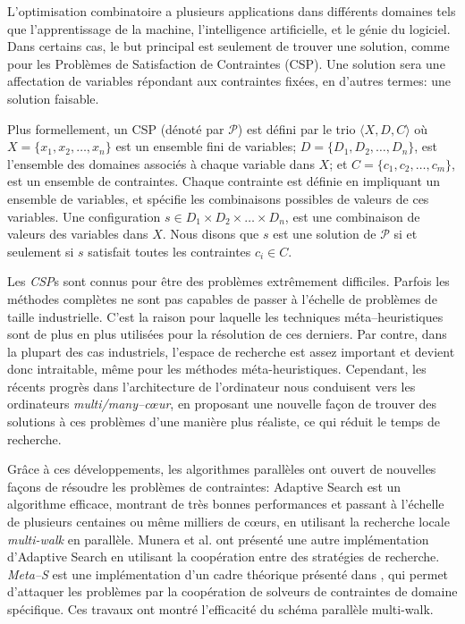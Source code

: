 L'optimisation combinatoire a plusieurs applications dans diff\'erents domaines tels que l'apprentissage de la machine, l'intelligence artificielle, et le g\'enie du logiciel. Dans certains cas, le but principal est seulement de trouver une solution, comme pour les Probl\`emes de Satisfaction de Contraintes (CSP). Une solution sera une affectation de variables r\'epondant aux contraintes fix\'ees, en d'autres termes: une solution faisable.

Plus formellement, un CSP (d\'enot\'e par $\mathcal{P}$) est d\'efini par le trio $\langle X,D,C \rangle$  o\`u $X = \{x_1, x_2,\dots,x_n\}$ est un ensemble fini de variables; $D = \{D_1, D_2,\dots, D_n\}$, est l'ensemble des domaines associ\'es \`a chaque variable dans $X$; et $C = \{c_1, c_2,\dots,c_m\}$, est un ensemble de contraintes. Chaque contrainte est d\'efinie en impliquant un ensemble de variables, et sp\'ecifie les combinaisons possibles de valeurs de ces variables. Une configuration $s\in D_1\times D_2\times\dots\times D_n$, est une combinaison de valeurs des variables dans $X$. Nous disons que $s$ est une solution de $\mathcal{P}$ si et seulement si $s$ satisfait toutes les contraintes $c_i \in C$.

Les {\it CSP}s sont connus pour \^etre des probl\`emes extr\^emement difficiles. Parfois les m\'ethodes compl\`etes ne sont pas capables de passer \`a l'\'echelle de probl\`emes de taille industrielle. C'est la raison  pour laquelle les techniques m\'eta--heuristiques sont de plus en plus utilis\'ees pour la r\'esolution de ces derniers. Par contre, dans la plupart des cas industriels, l'espace de recherche est assez important et devient donc intraitable, m\^eme pour les m\'ethodes m\'eta-heuristiques. Cependant, les r\'ecents progr\`es dans l'architecture de l'ordinateur nous conduisent vers les ordinateurs {\it multi/many--c\oe ur}, en proposant une nouvelle fa\c{c}on de trouver des solutions \`a ces probl\`emes d'une mani\`ere plus r\'ealiste, ce qui r\'eduit le temps de recherche.

Gr\^ace \`a ces d\'eveloppements, les algorithmes parall\`eles ont ouvert de nouvelles fa\c{c}ons de r\'esoudre les probl\`emes de contraintes: Adaptive Search \cite{Diaz} est un algorithme efficace, montrant de tr\`es bonnes performances et passant \`a l'\'echelle de plusieurs centaines ou m\^eme milliers de c\oe urs, en utilisant la recherche locale {\it multi-walk} en parall\`ele. Munera et al. \cite{Munera} ont pr\'esent\'e une autre impl\'ementation d'Adaptive Search en utilisant la coop\'eration entre des strat\'egies de recherche. {\it Meta--S} est une impl\'ementation d'un cadre th\'eorique pr\'esent\'e dans \cite{Frank2003}, qui permet d'attaquer les probl\`emes par la coop\'eration de solveurs de contraintes de domaine sp\'ecifique. 
Ces travaux ont montr\'e l'efficacit\'e du sch\'ema parall\`ele multi-walk.  

